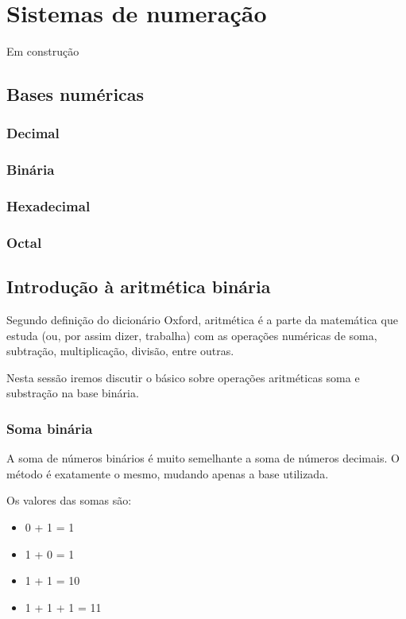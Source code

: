 \chapter{Sistemas de numeração}
\label{sinais}

Em construção


\section{Bases numéricas}
\label{bases}

\subsection{Decimal}
\subsection{Binária}
\subsection{Hexadecimal}
\subsection{Octal}

\section{Introdução à aritmética binária}
\label{aritmetica}

Segundo definição do dicionário Oxford, aritmética é a parte da matemática que estuda (ou, por assim dizer, trabalha) com as operações numéricas de soma, subtração, multiplicação, divisão, entre outras.

Nesta sessão iremos discutir o básico sobre operações aritméticas soma e substração na base binária.

\subsection{Soma binária}
\label{somabinaria}

A soma de números binários é muito semelhante a soma de números decimais. O método é exatamente o mesmo, mudando apenas a base utilizada.

Os valores das somas são:
\begin{itemize}
	\item 0 + 1 = 1
	\item 1 + 0 = 1
	\item 1 + 1 = 10
	\item 1 + 1 + 1 = 11
\end{itemize}

